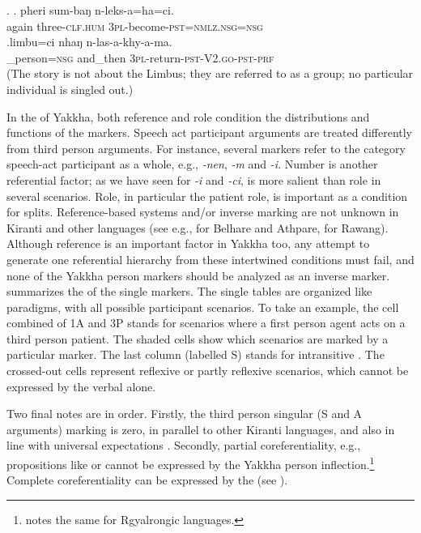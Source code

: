 \ex. \ag.           pheri sum-baŋ       n-leks-a=ha=ci.\\
again three{\scshape -clf.hum} {\scshape 3pl-}become{\scshape -pst=nmlz.nsg=nsg}\\
 
\bg.limbu=ci nhaŋ n-las-a-khy-a-ma.\\
\_person{\scshape =nsg} and\_then {\scshape 3pl-}return{\scshape -pst-V2.go-pst-prf}\\
 (The story is not about the Limbus; they are referred to as  a group; no particular individual is singled out.) 

\newpage
In the  of Yakkha, both reference and role condition the distributions and functions of the markers. Speech act participant arguments are treated differently from third person arguments. For instance, several markers refer to the category speech-act participant as a whole, e.g., \emph{-nen}, \emph{-m} and \emph{-i}. Number is another referential factor; as we have seen for \emph{-i} and \emph{-ci},  is more salient than role in several scenarios. Role, in particular the patient role, is important as a condition for  splits. 
Reference-based systems and/or inverse marking are not unknown in Kiranti and other  languages  (see e.g., \citet{Ebert1991Inverse} for Belhare and Athpare, \citet{LaPolla2007Hierarchical} for Rawang). Although reference is an important factor in Yakkha too, any attempt to generate one referential hierarchy from these intertwined conditions must  fail, and none of the Yakkha person markers should be analyzed as an inverse marker.  summarizes  the  of the single markers. The single tables are organized like paradigms, with all possible participant scenarios. To take an example, the cell combined of 1A and 3P stands for scenarios where a first person agent acts on a third person patient. The shaded cells show which  scenarios are marked by a particular marker. The last column (labelled S) stands for intransitive . The crossed-out cells represent reflexive or partly reflexive scenarios, which cannot be expressed by the verbal  alone.

Two final notes are in order. Firstly, the third person singular (S and A arguments) marking is zero, in parallel to other Kiranti languages, and also in line with universal expectations \citep{Siewierska2008_Person}. Secondly, partial coreferentiality, e.g., propositions like  or  cannot be expressed by the Yakkha person inflection.\footnote{\citet{Jacques2012_Agreement} notes the same for Rgyalrongic languages.}  Complete coreferentiality can be expressed by the   (see  ).

